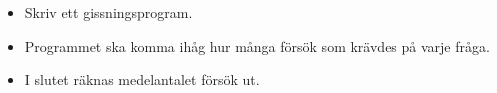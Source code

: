 \begin{frame}
  \begin{exercise}
    \begin{itemize}
      \item Skriv ett gissningsprogram.
      \item Programmet ska komma ihåg hur många försök som krävdes på varje 
        fråga.
      \item I slutet räknas medelantalet försök ut.
    \end{itemize}
  \end{exercise}
\end{frame}

